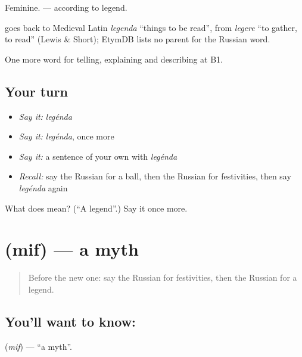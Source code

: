 Feminine. \emph{ } — according to legend.

\begin{cousinweb}
\emph{} goes back to Medieval Latin \emph{legenda} \textquotedblleft{}things to be read\textquotedblright{}, from \emph{legere} \textquotedblleft{}to gather, to read\textquotedblright{} (Lewis \& Short); EtymDB lists no parent for the Russian word.
\end{cousinweb}

\begin{grammarlens}[title={What you've built}]
One more word for telling, explaining and describing at B1.
\end{grammarlens}

\subsection*{Your turn}
\begin{itemize}
\raggedright
  \item \emph{Say it:} \emph{legénda}
  \item \emph{Say it:} \emph{legénda}, once more
  \item \emph{Say it:} a sentence of your own with \emph{legénda}
  \item \emph{Recall:} say the Russian for a ball, then the Russian for festivities, then say \emph{legénda} again
\end{itemize}

\begin{tcolorbox}[breakable,colback=teal!4,colframe=teal!35!black,title={Before you move on}]
What does  mean? (\textquotedblleft{}A legend\textquotedblright{}.) Say it once more.
\end{tcolorbox}
\section[\texorpdfstring{\ru{миф} (mif)}{миф (mif)}]{ (mif) — a myth}

\label{lesson:RU-C319-mif}



\begin{quote}
Before the new one: say the Russian for festivities, then the Russian for a legend.
\end{quote}

\subsection*{You'll want to know: }
\textbf{} (\emph{mif}) — \textquotedblleft{}a myth\textquotedblright{}.

